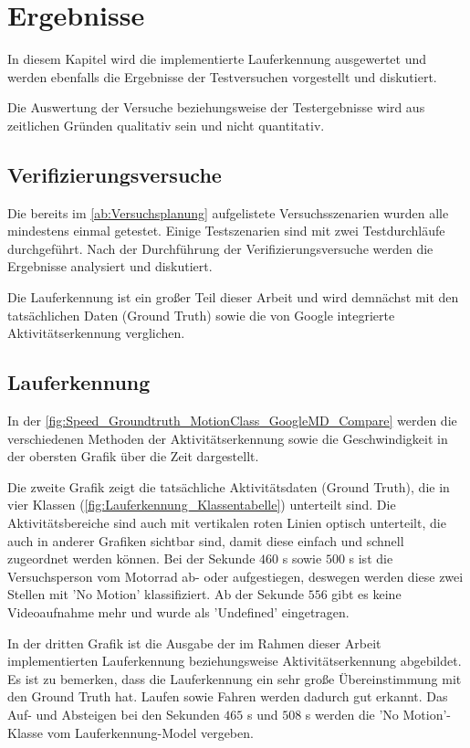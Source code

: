 \chapter{Ergebnisse}

In diesem Kapitel wird die implementierte Lauferkennung ausgewertet und werden ebenfalls die Ergebnisse der Testversuchen vorgestellt und diskutiert.

Die Auswertung der Versuche beziehungsweise der Testergebnisse wird aus zeitlichen Gründen qualitativ sein und nicht quantitativ.


\section{Verifizierungsversuche}

Die bereits im \autoref{ab:Versuchsplanung} aufgelistete Versuchsszenarien wurden alle mindestens einmal getestet. Einige Testszenarien sind mit zwei Testdurchläufe durchgeführt.
Nach der Durchführung der Verifizierungsversuche werden die Ergebnisse analysiert und diskutiert. 

Die Lauferkennung ist ein großer Teil dieser Arbeit und wird demnächst mit den tatsächlichen Daten (Ground Truth) sowie die von Google integrierte Aktivitätserkennung verglichen.
\section{Lauferkennung}

In der \autoref{fig:Speed_Groundtruth_MotionClass_GoogleMD_Compare} werden die verschiedenen Methoden der Aktivitätserkennung sowie die Geschwindigkeit in der obersten Grafik über die Zeit dargestellt.

Die zweite Grafik zeigt die tatsächliche Aktivitätsdaten (Ground Truth), die in vier Klassen (\autoref{fig:Lauferkennung_Klassentabelle}) unterteilt sind. Die Aktivitätsbereiche sind auch mit vertikalen roten Linien optisch unterteilt, die auch in anderer Grafiken sichtbar sind, damit diese einfach und schnell zugeordnet werden können. Bei der Sekunde $460$ s sowie $500$ s ist die Versuchsperson vom Motorrad ab- oder aufgestiegen, deswegen werden diese zwei Stellen mit 'No Motion' klassifiziert. Ab der Sekunde $556$ gibt es keine Videoaufnahme mehr und wurde als 'Undefined' eingetragen.

In der dritten Grafik ist die Ausgabe der im Rahmen dieser Arbeit implementierten Lauferkennung beziehungsweise Aktivitätserkennung abgebildet. 
Es ist zu bemerken, dass die Lauferkennung ein sehr große Übereinstimmung mit den Ground Truth hat. Laufen sowie Fahren werden dadurch gut erkannt. Das Auf- und Absteigen bei den Sekunden $465$ s und $508$ s werden die 'No Motion'-Klasse vom Lauferkennung-Model vergeben.

